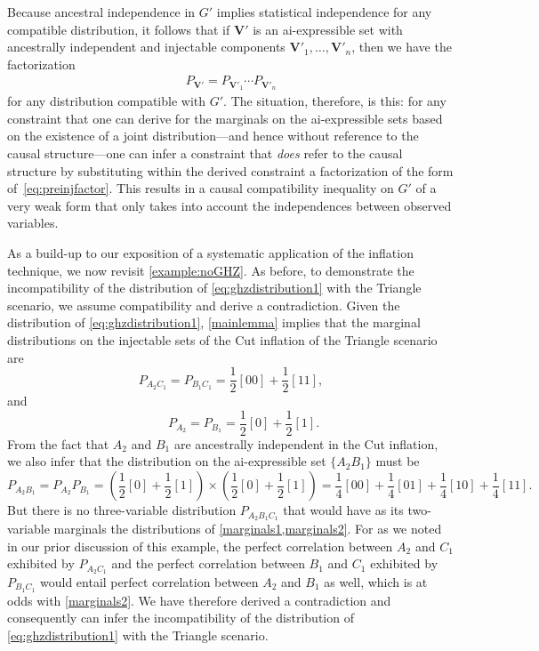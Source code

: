 \documentclass[aps,english,10pt,superscriptaddress,onecolumn,twoside,longbibliography,pra,floatfix,fleqn,nofootinbib]{revtex4-1}
\theoremstyle{definition}
\newcounter{example}[section]
\begin{document}
Because ancestral independence in $G'$ implies statistical independence for any compatible distribution, it follows that if $\bm{V}'$ is an ai-expressible set with ancestrally independent and injectable components $\bm{V}'_1,\ldots,\bm{V}'_n$, then we have the factorization
\begin{align}\label{eq:preinjfactor}
P_{\bm{V}'} = P_{\bm{V}'_1} \cdots P_{\bm{V}'_n}
\end{align}
for any distribution compatible with $G'$. The situation, therefore, is this: for any constraint that one can derive for the marginals on the ai-expressible sets based on the existence of a joint distribution---and hence without reference to the causal structure---one can infer a constraint that {\em does} refer to the causal structure by substituting within the derived constraint a factorization of the form of~\cref{eq:preinjfactor}. This results in a causal compatibility inequality on $G'$ of a very weak form that only takes into account the independences between observed variables.



As a build-up to our exposition of a systematic application of the inflation technique, we now revisit \cref{example:noGHZ}.  As before, to demonstrate the incompatibility of the distribution of \cref{eq:ghzdistribution1} with the Triangle scenario, we assume compatibility and derive a contradiction.  Given the distribution of \cref{eq:ghzdistribution1}, \cref{mainlemma} implies that the marginal distributions on the injectable sets of the Cut inflation of the Triangle scenario are 
\begin{equation}
P_{A_2 C_1} = P_{B_1 C_1} = \frac{1}{2} [00] +\frac{1}{2} [11], 
\label{marginals1}
\end{equation}
and
\begin{equation}
\qquad P_{A_2} = P_{B_1}=\frac{1}{2} [0] +\frac{1}{2} [1].
\label{marginals1prime}
\end{equation}
From the fact that $A_2$ and $B_1$ are ancestrally independent in the Cut inflation, we also infer that the distribution on the ai-expressible set $\{A_2 B_1\}$ must be
\begin{equation}
P_{A_2 B_1} = P_{A_2}P_{B_1} = \left(\frac{1}{2} [0] +\frac{1}{2} [1]\right)\times\left(\frac{1}{2} [0] +\frac{1}{2} [1]\right)=\frac{1}{4} [00]+\frac{1}{4} [01]+\frac{1}{4} [10]+\frac{1}{4} [11].
\label{marginals2}
\end{equation}
But there is no three-variable distribution $P_{A_2 B_1 C_1}$ that would have as its two-variable marginals the distributions of \cref{marginals1,marginals2}. For as we noted in our prior discussion of this example, the perfect correlation between $A_2$ and $C_1$ exhibited by $P_{A_2 C_1}$ and the perfect correlation between $B_1$ and $C_1$ exhibited by $P_{B_1 C_1}$ would entail perfect correlation between $A_2$ and $B_1$ as well, which is at odds with \eqref{marginals2}. 
We have therefore derived a contradiction and consequently can infer the incompatibility of the distribution of \cref{eq:ghzdistribution1} with the Triangle scenario.
\end{document}
